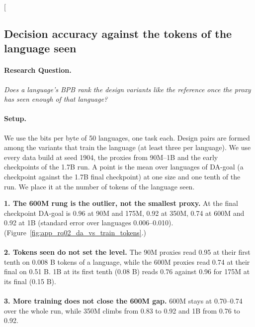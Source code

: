 \clearpage
\twocolumn[{%
\subsection{Decision accuracy against the tokens of the language seen}
\label{app:rq02_da_vs_train_tokens}

\noindent\begin{minipage}[t]{0.485\textwidth}
\vspace{0pt}
\paragraph{Research Question.} \emph{Does a language's BPB rank the design variants like the reference once the proxy has seen enough of that language?}

\paragraph{Setup.} We use the bits per byte of 50 languages, one task each. Design pairs are formed among the variants that train the language (at least three per language). We use every data build at seed 1904, the proxies from 90M--1B and the early checkpoints of the 1.7B run. A point is the mean over languages of DA-goal (a checkpoint against the 1.7B final checkpoint) at one size and one tenth of the run. We place it at the number of tokens of the language seen.
\end{minipage}\hfill
\begin{minipage}[t]{0.485\textwidth}
\vspace{0pt}
\begin{rqfinding}
\textbf{1. The 600M rung is the outlier, not the smallest proxy.} At the final checkpoint DA-goal is 0.96 at 90M and 175M, 0.92 at 350M, 0.74 at 600M and 0.92 at 1B (standard error over languages 0.006--0.010). (Figure~\ref{fig:app_rq02_da_vs_train_tokens}.)
\\
\\
\textbf{2. Tokens seen do not set the level.} The 90M proxies read 0.95 at their first tenth on 0.008 B tokens of a language, while the 600M proxies read 0.74 at their final on 0.51 B. 1B at its first tenth (0.08 B) reads 0.76 against 0.96 for 175M at its final (0.15 B).
\\
\\
\textbf{3. More training does not close the 600M gap.} 600M stays at 0.70--0.74 over the whole run, while 350M climbs from 0.83 to 0.92 and 1B from 0.76 to 0.92.
\end{rqfinding}
\end{minipage}

}
